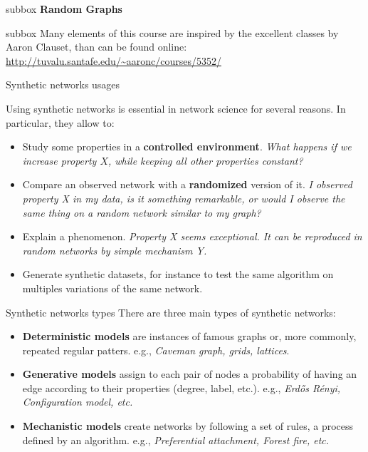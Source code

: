 \documentclass[a4paper,11pt]{book}
\begin{document}

\newpage



\begin{subbox}{subbox}{}
\centering
\Large{\textbf{Random Graphs}}
\end{subbox}


\begin{subbox}{subbox}{}
\centering
Many elements of this course are inspired by the excellent classes by Aaron Clauset, than can be found online:  \url{ http://tuvalu.santafe.edu/~aaronc/courses/5352/}  \end{subbox}








\begin{textbox}{Synthetic networks usages}

Using synthetic networks is essential in network science for several reasons. In particular, they allow to:
\begin{itemize}
    \item Study some properties in a \textbf{controlled environment}. \textit{What happens if we increase property $X$, while keeping all other properties constant?}
    \item Compare an observed network with a \textbf{randomized} version of it. \textit{I observed property X in my data, is it something remarkable, or would I observe the same thing on a random network similar to my graph?}
    \item Explain a phenomenon. \textit{Property X seems exceptional. It can be reproduced in random networks by simple mechanism Y.}
    \item Generate synthetic datasets, for instance to test the same algorithm on multiples variations of the same network.
\end{itemize}

\end{textbox}




\begin{textbox}{Synthetic networks types}
There are three main types of synthetic networks:
\begin{itemize}
    \item \textbf{Deterministic models} are instances of famous graphs or, more commonly, repeated regular patters. e.g., \textit{Caveman graph, grids, lattices}.
    \item \textbf{Generative models} assign to each pair of nodes a probability of having an edge according to their properties (degree, label, etc.). e.g., \textit{Erdős Rényi, Configuration model, etc.} 
    \item \textbf{Mechanistic models} create networks by following a set of rules, a process defined by an algorithm. e.g., \textit{Preferential attachment, Forest fire, etc.}
\end{itemize}
\end{textbox}
\end{document}
